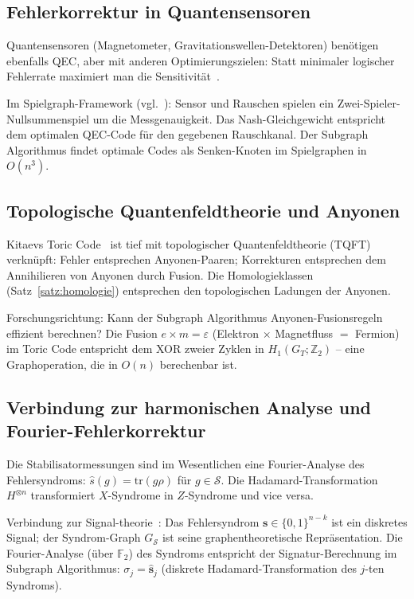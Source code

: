 ﻿\documentclass[a4paper,12pt]{article}
\theoremstyle{definition}
\newcommand{\Stab}{\mathcal{S}}
\begin{document}
\subsection{Fehlerkorrektur in Quantensensoren}

Quantensensoren (Magnetometer, Gravitationswellen-Detektoren) ben\"otigen
ebenfalls QEC, aber mit anderen Optimierungszielen: Statt minimaler logischer
Fehlerrate maximiert man die Sensitivit\"at~\cite{kaubruegger2021}.

Im Spielgraph-Framework (vgl.~\cite{epp2026spieltheorie}): Sensor und
Rauschen spielen ein Zwei-Spieler-Nullsummenspiel um die Messgenauigkeit.
Das Nash-Gleichgewicht entspricht dem optimalen QEC-Code f\"ur den gegebenen
Rauschkanal. Der Subgraph Algorithmus findet optimale Codes als
Senken-Knoten im Spielgraphen in $O(n^3)$.

\subsection{Topologische Quantenfeldtheorie und Anyonen}

Kitaevs Toric Code~\cite{kitaev2003} ist tief mit topologischer
Quantenfeldtheorie (TQFT) verkn\"upft: Fehler entsprechen Anyonen-Paaren;
Korrekturen entsprechen dem Annihilieren von Anyonen durch Fusion.
Die Homologieklassen (Satz~\ref{satz:homologie}) entsprechen den
topologischen Ladungen der Anyonen.

Forschungsrichtung: Kann der Subgraph Algorithmus Anyonen-Fusionsregeln
effizient berechnen? Die Fusion $e \times m = \varepsilon$ (Elektron $\times$
Magnetfluss $=$ Fermion) im Toric Code entspricht dem XOR zweier Zyklen
in $H_1(G_T; \mathbb{Z}_2)$ -- eine Graphoperation, die in $O(n)$ berechenbar ist.

\subsection{Verbindung zur harmonischen Analyse und Fourier-Fehlerkorrektur}

Die Stabilisatormessungen sind im Wesentlichen eine Fourier-Analyse des
Fehlersyndroms: $\hat{s}(g) = \mathrm{tr}(g \rho)$ f\"ur $g \in \Stab$.
Die Hadamard-Transformation~\cite{epp2026hadamard} $H^{\otimes n}$ transformiert
$X$-Syndrome in $Z$-Syndrome und vice versa.

Verbindung zur Signal-theorie~\cite{epp2026signal}: Das Fehlersyndrom
$\mathbf{s} \in \{0,1\}^{n-k}$ ist ein diskretes Signal; der Syndrom-Graph
$G_{\mathcal{S}}$ ist seine graphentheoretische Repr\"asentation.
Die Fourier-Analyse (\"uber $\mathbb{F}_2$) des Syndroms entspricht der
Signatur-Berechnung im Subgraph Algorithmus: $\sigma_j = \hat{\mathbf{s}}_j$
(diskrete Hadamard-Transformation des $j$-ten Syndroms).
\end{document}
